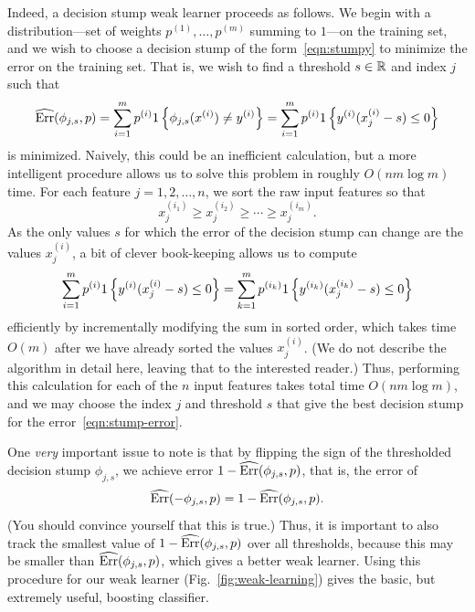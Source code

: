 \documentclass{article}
\newcommand{\represent}{\phi}
\begin{document}
Indeed, a decision stump weak learner proceeds as follows. We begin
with a distribution---set of weights $p^{(1)}, \ldots, p^{(m)}$ summing
to $1$---on the training set, and we wish to choose a decision
stump of the form~\eqref{eqn:stumpy} to minimize the error on the
training set. That is, we wish to find a threshold
$s \in \mathbb{R}$ and index $j$ such that
\begin{equation}
  \label{eqn:stump-error}
  \what{\rm Err}(\represent_{j,s}, p)
  = \sum_{i = 1}^m p^{(i)} \indic{\represent_{j,s}(\xsi) \neq \ysi}
  = \sum_{i = 1}^m p^{(i)} \indic{\ysi (x_j^{(i)} - s) \le 0}
\end{equation}
is minimized. Naively, this could be an inefficient calculation, but
a more intelligent procedure allows us to solve this problem in roughly
$O(nm \log m)$ time. For each feature $j = 1, 2, \ldots, n$, we sort
the raw input features so that
\begin{equation*}
  x_j^{(i_1)} \ge x_j^{(i_2)} \ge \cdots \ge x_j^{(i_m)}.
\end{equation*}
As the only values $s$ for which the error of the decision stump
can change are the values $x_j^{(i)}$, a bit of clever book-keeping
allows us to compute
\begin{equation*}
  \sum_{i = 1}^m p^{(i)} 1\left\{{y^{(i)}(x_j^{(i)} - s) \le 0}\right\}
  = \sum_{k = 1}^m p^{(i_k)} 1\left\{{y^{(i_k)} (x_j^{(i_k)} - s) \le 0}\right\}
\end{equation*}
efficiently by incrementally modifying the sum in sorted order, which takes
time $O(m)$ after we have already sorted the values $x_j^{(i)}$.  (We do not
describe the algorithm in detail here, leaving that to the interested
reader.) Thus, performing this calculation for each of the $n$ input features
takes total time $O(nm \log m)$, and we may choose the index $j$ and
threshold $s$ that give the best decision stump for the
error~\eqref{eqn:stump-error}.

One \emph{very} important issue to note is that by flipping the sign of the
thresholded decision stump $\represent_{j,s}$, we achieve error $1 - \what{\rm
  Err}(\represent_{j, s}, p)$, that is, the error of
\begin{equation*}
  \what{\rm Err}(-\represent_{j, s}, p) =
  1 - \what{\rm Err}(\represent_{j, s}, p).
\end{equation*}
(You should convince yourself that this is true.)
Thus, it is important to also track the smallest value of $1 - \what{\rm
  Err}(\represent_{j,s}, p)$ over all thresholds, because this may be smaller than
$\what{\rm Err}(\represent_{j,s}, p)$, which gives a better weak learner.
Using this procedure for our weak learner (Fig.~\ref{fig:weak-learning})
gives the basic, but extremely useful, boosting classifier.
\end{document}
